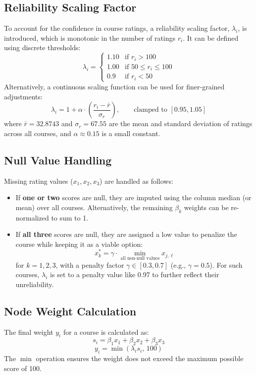 \documentclass[11pt]{article}
\begin{document}
\subsection{Reliability Scaling Factor}

To account for the confidence in course ratings, a reliability scaling factor, $\lambda_i$, is introduced, which is monotonic in the number of ratings $r_i$. It can be defined using discrete thresholds:
\[
    \lambda_i =
    \begin{cases}
        1.10 & \text{if } r_i > 100 \\
        1.00 & \text{if } 50 \leq r_i \leq 100 \\
        0.9 & \text{if } r_i < 50
    \end{cases}
\]
Alternatively, a continuous scaling function can be used for finer-grained adjustments:
\[
    \lambda_i = 1 + \alpha \cdot \left( \frac{r_i - \bar{r}}{\sigma_r} \right),\qquad \text{clamped to } [0.95, 1.05]
\]
where $\bar{r} = 32.8743$ and $\sigma_r = 67.55$ are the mean and standard deviation of ratings across all courses, and $\alpha \approx 0.15$ is a small constant.

\subsection{Null Value Handling}

Missing rating values ($x_1, x_2, x_3$) are handled as follows:
\begin{itemize}
    \item If \textbf{one or two} scores are null, they are imputed using the column median (or mean) over all courses. Alternatively, the remaining $\beta_k$ weights can be re-normalized to sum to 1.
    \item If \textbf{all three} scores are null, they are assigned a low value to penalize the course while keeping it as a viable option:
    \[
        x_k^* = \gamma \cdot \min_{\text{all non-null values}} x_{j,\ell}
    \]
    for $k=1,2,3$, with a penalty factor $\gamma \in [0.3, 0.7]$ (e.g., $\gamma = 0.5$). For such courses, $\lambda_i$ is set to a penalty value like 0.97 to further reflect their unreliability.
\end{itemize}

\subsection{Node Weight Calculation}

The final weight $y_i$ for a course is calculated as:
\[
    s_i = \beta_1 x_1 + \beta_2 x_2 + \beta_3 x_3
\]
\[
    y_i = \min(\lambda_i s_i,\, 100)
\]
The $\min$ operation ensures the weight does not exceed the maximum possible score of 100.
\end{document}
